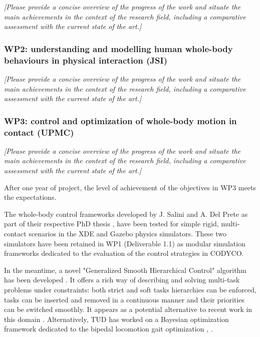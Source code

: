 \documentclass[12pt,a4paper,twoside]{article}
\begin{document}
\emph{\color{red}[Please provide a concise overview of the progress of the work and situate the main achievements in the context of the research field, including a comparative assessment with the current state of the art.]}

\subsubsection{WP2: understanding and modelling human whole-body behaviours in physical interaction (JSI)}

\emph{\color{red}[Please provide a concise overview of the progress of the work and situate the main achievements in the context of the research field, including a comparative assessment with the current state of the art.]}

\subsubsection{WP3: control and optimization of whole-body motion in contact (UPMC)}

\emph{\color{red}[Please provide a concise overview of the progress of the work and situate the main achievements in the context of the research field, including a comparative assessment with the current state of the art.]}

After one year of project, the level of achievement of the objectives in WP3 meets the expectations.

The whole-body control frameworks developed by J. Salini and A. Del Prete as part of their respective PhD thesis \cite{salini2012}, \cite{delprete2013} have been tested for simple rigid, multi-contact scenarios in the XDE \cite{XDE} and Gazebo \cite{Gazebo} physics simulators. These two simulators have been retained in WP1 (Deliverable 1.1) as modular simulation frameworks dedicated to the evaluation of the control strategies in CODYCO.

In the meantime, a novel "Generalized Smooth Hierarchical Control" algorithm has been developed \cite{liu2013}. It offers a rich way of describing and solving multi-task problems under constraints: both strict and soft tasks hierarchies can be enforced, tasks can be inserted and removed in a continuous manner and their priorities can be switched smoothly. It appears as a potential alternative to recent work in this domain \cite{escande2012}. Alternatively, TUD has worked on a Bayesian optimization framework dedicated to the bipedal locomotion gait optimization \cite{calandra2014}, \cite{calandra2014b}.
\end{document}
